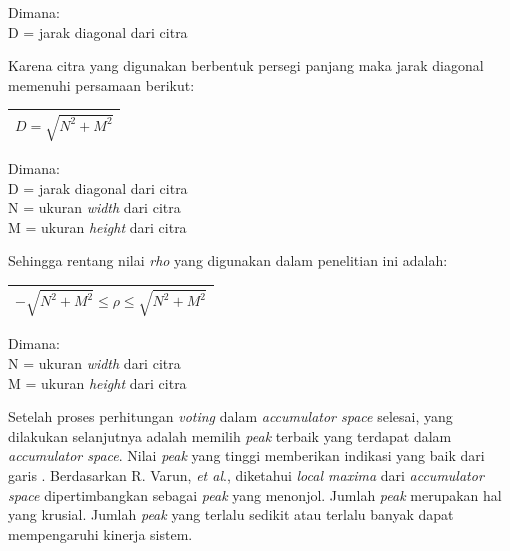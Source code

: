 \noindent Dimana:\\
D = jarak diagonal dari citra

\noindent Karena citra yang digunakan berbentuk persegi panjang maka jarak diagonal memenuhi persamaan berikut:

\begin{table}[H]
	\begin{adjustbox}{width=1\textwidth}
		\begin{tabular}{|p{13.55cm}|}
			\hline
			\begin{equation}
			D = \sqrt{N^2 + M^2}
			\end{equation}\\
			\hline
		\end{tabular}
	\end{adjustbox}
\end{table}

\noindent Dimana:\\
D = jarak diagonal dari citra\\
N = ukuran \textit{width} dari citra\\
M = ukuran \textit{height} dari citra

\noindent Sehingga rentang nilai \textit{rho} yang digunakan dalam penelitian ini adalah:

\begin{table}[H]
	\begin{adjustbox}{width=1\textwidth}
		\begin{tabular}{|p{13.55cm}|}
			\hline
			\begin{equation}
			-\sqrt{N^2 + M^2} \leq \rho \leq \sqrt{N^2 + M^2}
			\end{equation}\\
			\hline
		\end{tabular}
	\end{adjustbox}
\end{table}

\noindent Dimana:\\
N = ukuran \textit{width} dari citra\\
M = ukuran \textit{height} dari citra

\noindent Setelah proses perhitungan \textit{voting} dalam \textit{accumulator space} selesai, yang dilakukan selanjutnya adalah memilih \textit{peak} terbaik yang terdapat dalam \textit{accumulator space}. Nilai \textit{peak} yang tinggi memberikan indikasi yang baik dari garis \cite{oechsle}. Berdasarkan R. Varun, \textit{et al}., diketahui \textit{local maxima} dari \textit{accumulator space} dipertimbangkan sebagai \textit{peak} yang menonjol. Jumlah \textit{peak} merupakan hal yang krusial. Jumlah \textit{peak} yang terlalu sedikit atau terlalu banyak dapat mempengaruhi kinerja sistem.

